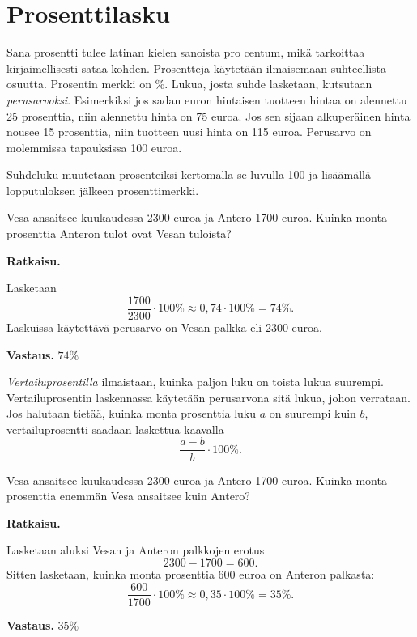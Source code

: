 \chapter{Prosenttilasku}

Sana prosentti tulee latinan kielen sanoista pro centum, mikä tarkoittaa
kirjaimellisesti sataa kohden. Prosentteja käytetään ilmaisemaan suhteellista
osuutta. Prosentin merkki on \%. Lukua, josta suhde lasketaan, kutsutaan \emph{perusarvoksi}. Esimerkiksi jos sadan euron hintaisen tuotteen hintaa on alennettu 25 prosenttia, niin alennettu hinta on 75 euroa. Jos sen sijaan alkuperäinen hinta nousee 15 prosenttia, niin tuotteen uusi hinta on 115 euroa. Perusarvo on molemmissa tapauksissa 100 euroa.



Suhdeluku muutetaan prosenteiksi kertomalla se luvulla 100 ja lisäämällä
lopputuloksen jälkeen prosenttimerkki.

\begin{esimerkki}
	Vesa ansaitsee kuukaudessa 2300 euroa ja Antero 1700 euroa.
    Kuinka monta prosenttia Anteron tulot ovat Vesan tuloista? 
    
    {\bf Ratkaisu.}
    
    Lasketaan
    \[
    \frac{1700}{2300} \cdot 100 \% \approx 0,74\cdot 100 \% = 74 \%.
    \]
    Laskuissa käytettävä perusarvo on Vesan palkka eli 2300 euroa.
    
    {\bf Vastaus.}
     $74 \%$
\end{esimerkki}


\emph{Vertailuprosentilla} ilmaistaan, kuinka paljon luku on toista lukua suurempi.
Vertailuprosentin laskennassa käytetään perusarvona sitä lukua, johon
verrataan. Jos halutaan tietää, kuinka monta prosenttia luku $a$ on suurempi kuin $b$, vertailuprosentti saadaan laskettua kaavalla
\[
\frac{a-b}{b} \cdot 100 \%.
\]

\begin{esimerkki}
    Vesa ansaitsee kuukaudessa 2300 euroa ja Antero 1700 euroa.
    Kuinka monta prosenttia enemmän Vesa ansaitsee kuin Antero?
    
    {\bf Ratkaisu.}
    
    Lasketaan aluksi Vesan ja Anteron palkkojen erotus
    \[
    2300-1700 = 600.
    \]
    Sitten lasketaan, kuinka monta prosenttia 600 euroa on Anteron palkasta:
    \[
    \frac{600}{1700} \cdot 100 \% \approx 0,35\cdot 100\% = 35 \%.
    \]
    
    {\bf Vastaus.}
    $35 \%$
\end{esimerkki}

